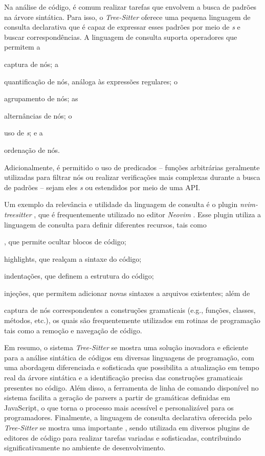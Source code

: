 \documentclass
  [11pt,a4paper,english,brazil,openright,sumario=tradicional,twoside]
  {abntex2}
\newcommand{\treesitter}{\textit{Tree-Sitter}\xspace}
\begin{document}
  Na análise de código, é comum realizar tarefas que envolvem a busca de
  padrões na árvore sintática. Para isso, o \treesitter oferece uma pequena
  linguagem de consulta declarativa que é capaz de expressar esses padrões por
  meio de \textit{s} e buscar correspondências. A linguagem
  de consulta suporta operadores que permitem a
  \begin{inparaenum}
    \item captura de nós; a
    \item quantificação de nós, análoga às expressões regulares; o
    \item agrupamento de nós; as
    \item alternâncias de nós; o
    \item uso de \textit{s}; e a
    \item ordenação de nós.
  \end{inparaenum}
  Adicionalmente, é permitido o uso de predicados -- funções arbitrárias
  geralmente utilizadas para filtrar nós ou realizar verificações mais
  complexas durante a busca de padrões -- sejam eles \textit{s}
  ou estendidos por meio de uma API.

  Um exemplo da relevância e utilidade da linguagem de consulta é o plugin
  \textit{nvim-treesitter} \cite{nvim-treesitter-2023-nvim}, que é
  frequentemente utilizado no editor \textit{Neovim}
  \cite{neovim-2023-hyperextensible}. Esse plugin utiliza a linguagem de
  consulta para definir diferentes recursos, tais como
  \begin{inparaenum}
    \item \textit{}, que permite ocultar blocos de código;
    \item highlights, que realçam a sintaxe do código;
    \item indentações, que definem a estrutura do código;
    \item injeções, que permitem adicionar novas sintaxes a arquivos
          existentes; além de
    \item captura de nós correspondentes a construções gramaticais (e.g.,
          funções, classes, métodos, etc.), os quais são frequentemente
          utilizados em rotinas de programação tais como a remoção e navegação
          de código.
  \end{inparaenum}

  Em resumo, o sistema \treesitter se mostra uma solução inovadora e eficiente
  para a análise sintática de códigos em diversas linguagens de programação,
  com uma abordagem diferenciada e sofisticada que possibilita a atualização em
  tempo real da árvore sintática e a identificação precisa das construções
  gramaticais presentes no código. Além disso, a ferramenta de linha de comando
  disponível no sistema facilita a geração de parsers a partir de gramáticas
  definidas em JavaScript, o que torna o processo mais acessível e
  personalizável para os programadores. Finalmente, a linguagem de consulta
  declarativa oferecida pelo \treesitter se mostra uma importante
  \textit{}, sendo utilizada em diversos plugins de editores de
  código para realizar tarefas variadas e sofisticadas, contribuindo
  significativamente no ambiente de desenvolvimento.
\end{document}
